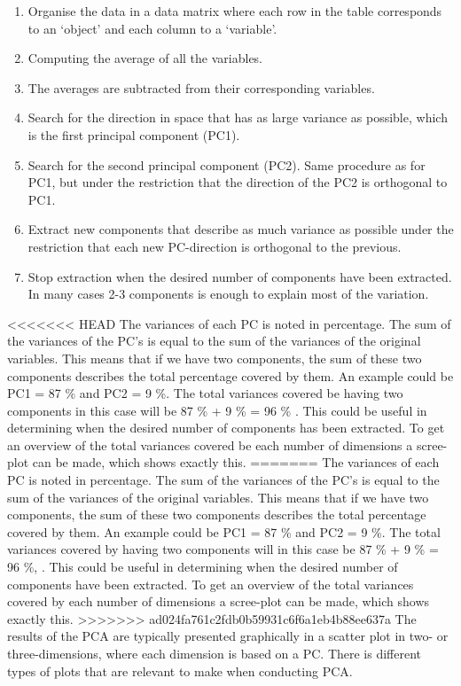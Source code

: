 \begin{enumerate}
	\item Organise the data in a data matrix where each row in the table corresponds to an ‘object’ and each column to a ‘variable’.
	\item Computing the average of all the variables. 
	\item The averages are subtracted from their corresponding variables.
	\item Search for the direction in space that has as large variance as possible, which is the first principal component (PC1).
	\item Search for the second principal component (PC2). Same procedure as for PC1, but under the restriction that the direction of the PC2 is orthogonal to PC1. 
	\item Extract new components that describe as much variance as possible under the restriction that each new PC-direction is orthogonal to the previous.
	\item Stop extraction when the desired number of components have been extracted. In many cases 2-3 components is enough to explain most of the variation. 
\end{enumerate}
\blankline
%
<<<<<<< HEAD
The variances of each PC is noted in percentage.
The sum of the variances of the PC's is equal to the sum of the variances of the original variables. This means that if we have two components, the sum of these two components describes the total percentage covered by them. An example could be PC1 = 87 \% and PC2 = 9 \%. The total variances covered be having two components in this case will be 87 \% + 9 \% = 96 \% \parencite[p. 213]{Naes2010}. This could be useful in determining when the desired number of components has been extracted. To get an overview of the total variances covered be each number of dimensions a scree-plot can be made, which shows exactly this. \blankline
=======
The variances of each PC is noted in percentage. The sum of the variances of the PC's is equal to the sum of the variances of the original variables. This means that if we have two components, the sum of these two components describes the total percentage covered by them. An example could be PC1 = 87 \% and PC2 = 9 \%. The total variances covered by having two components will in this case be 87 \% + 9 \% = 96 \%, \parencite[p. 213]{Naes2010}. This could be useful in determining when the desired number of components have been extracted. To get an overview of the total variances covered by each number of dimensions a scree-plot can be made, which shows exactly this. \blankline
>>>>>>> ad024fa761c2fdb0b59931c6f6a1eb4b88ee637a
%
The results of the PCA are typically presented graphically in a scatter plot in two- or three-dimensions, where each dimension is based on a PC. There is different types of plots that are relevant to make when conducting PCA. 

